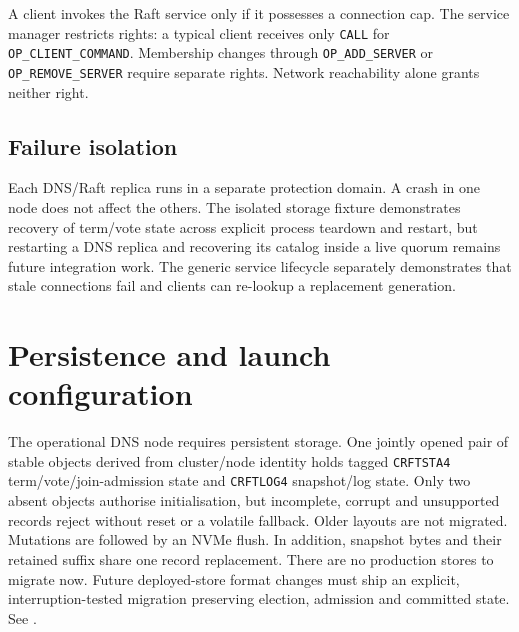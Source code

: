 A client invokes the Raft service only if it possesses a connection cap. The
service manager restricts rights: a typical client receives only
\texttt{CALL} for \texttt{OP\_CLIENT\_COMMAND}. Membership changes through
\texttt{OP\_ADD\_SERVER} or \texttt{OP\_REMOVE\_SERVER} require separate rights.
Network reachability alone grants neither right.

\subsection{Failure isolation}

Each DNS/Raft replica runs in a separate protection domain. A crash in one node
does not affect the others. The isolated storage fixture demonstrates recovery
of term/vote state across explicit process teardown and restart, but restarting a
DNS replica and recovering its catalog inside a live quorum remains future
integration work. The generic service lifecycle separately demonstrates that
stale connections fail and clients can re-lookup a replacement generation.

\section{Persistence and launch configuration}

The operational DNS node requires persistent storage. One jointly opened pair
of stable objects derived from cluster/node identity holds tagged
\texttt{CRFTSTA4} term/vote/join-admission state and \texttt{CRFTLOG4}
snapshot/log state. Only two absent objects authorise initialisation, but
incomplete, corrupt and unsupported records reject without reset or a volatile
fallback. Older layouts are not migrated. Mutations are followed by an NVMe
flush. In addition, snapshot bytes and their retained suffix share one record replacement.
There are no production stores to migrate now. Future deployed-store format
changes must ship an explicit, interruption-tested migration preserving
election, admission and committed state. See
.

